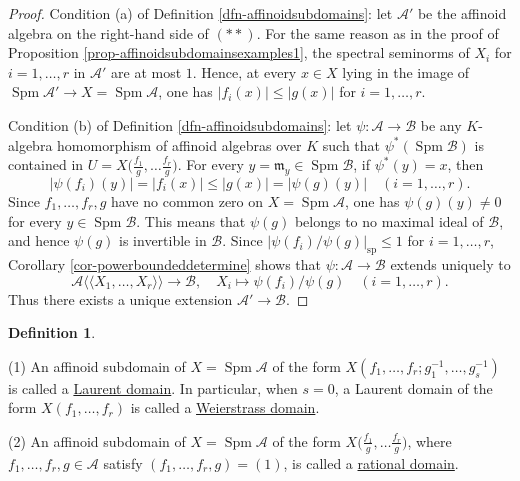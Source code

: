 \documentclass[a4paper,12pt, dvipdfmx]{jsbook}
\def\m{\mathfrak{m}}
\def\sp{\mathop{\mathrm{sp}}\nolimits}
\def\Spm{\mathop{\mathrm{Spm}}\nolimits}
\def\dl{\langle\!\langle}
\def\dr{\rangle\!\rangle}
\newcommand{\abs}[1]{\lvert#1\rvert}
\theoremstyle{plain}
\theoremstyle{definition}
\newtheorem{dfn}[thm]{\bfseries Definition}
\begin{document}
\begin{proof}[Proof]
Condition (a) of Definition \ref{dfn-affinoidsubdomains}: let $\mathcal{A}'$ be the affinoid algebra on the right-hand side of $(\ast\ast)$.
For the same reason as in the proof of Proposition \ref{prop-affinoidsubdomainsexamples1}, the spectral seminorms of $X_i$ for $i=1,\ldots,r$ in $\mathcal{A}'$ are at most $1$. Hence, at every $x\in X$ lying in the image of $\Spm\mathcal{A}'\rightarrow X=\Spm\mathcal{A}$, one has $\abs{f_i(x)}\leq\abs{g(x)}$ for $i=1,\ldots,r$.

Condition (b) of Definition \ref{dfn-affinoidsubdomains}: let $\psi\colon\mathcal{A}\rightarrow\mathcal{B}$ be any $K$-algebra homomorphism of affinoid algebras over $K$ such that $\psi^{\ast}(\Spm\mathcal{B})$ is contained in $U=X\big({\textstyle \frac{f_1}{g},\ldots\frac{f_r}{g}}\big)$.
For every $y=\m_y\in\Spm\mathcal{B}$, if $\psi^{\ast}(y)=x$, then
$$
\abs{\psi(f_i)(y)}=\abs{f_i(x)}\leq\abs{g(x)}=\abs{\psi(g)(y)}\quad (i=1,\ldots,r).
$$
Since $f_1,\ldots,f_r,g$ have no common zero on $X=\Spm\mathcal{A}$, one has $\psi(g)(y)\neq 0$ for every $y\in\Spm\mathcal{B}$.
This means that $\psi(g)$ belongs to no maximal ideal of $\mathcal{B}$, and hence $\psi(g)$ is invertible in $\mathcal{B}$.
Since $\abs{\psi(f_i)/\psi(g)}_{\sp}\leq 1$ for $i=1,\ldots,r$, Corollary \ref{cor-powerboundeddetermine} shows that $\psi\colon\mathcal{A}\rightarrow\mathcal{B}$ extends uniquely to
$$
\mathcal{A}\dl X_1,\ldots,X_r\dr\longrightarrow\mathcal{B},\quad
 X_i\longmapsto\psi(f_i)/\psi(g)\quad (i=1,\ldots,r).
$$
Thus there exists a unique extension $\mathcal{A}'\rightarrow\mathcal{B}$.
\end{proof}

\begin{dfn}\label{dfn-affinoiddomainsexamples}{\rm 
(1) An affinoid subdomain of $X=\Spm\mathcal{A}$ of the form $X(f_1,\ldots,f_r;g^{-1}_1,\ldots,g^{-1}_s)$ is called a \underline{Laurent domain}. In particular, when $s=0$, a Laurent domain of the form $X(f_1,\ldots,f_r)$ is called a \underline{Weierstrass domain}.

(2) An affinoid subdomain of $X=\Spm\mathcal{A}$ of the form $X\big({\textstyle \frac{f_1}{g},\ldots\frac{f_r}{g}}\big)$, where $f_1,\ldots,f_r,g\in\mathcal{A}$ satisfy $(f_1,\ldots,f_r,g)=(1)$, is called a \underline{rational domain}.}
\end{dfn}
\end{document}
